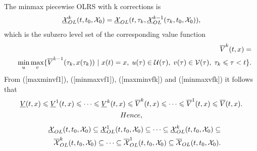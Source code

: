 \documentclass[letterpaper,10pt,english]{sphinxmanual}
\begin{document}
The minmax piecewise OLRS with k corrections is
\begin{gather}
\begin{split}\underline{{\mathcal X}}_{OL}^k(t, t_0, {\mathcal X}_0) =
\underline{{\mathcal X}}_{OL}(t, \tau_k, \underline{{\mathcal X}}_{OL}^{k-1}(\tau_k, t_0, {\mathcal X}_0)),
\label{minmaxk}\end{split}\notag
\end{gather}
which is the subzero level set of the corresponding value function
\begin{gather}
\begin{split}\begin{aligned}
&&\overline{V}^k(t, x) = \nonumber \\
&&\min_u\max_v\{\overline{V}^{k-1}(\tau_k, x(\tau_k)) ~|~ x(t)=x, \;
u(\tau)\in{\mathcal U}(\tau), \; v(\tau)\in{\mathcal V}(\tau), \; \tau_k\leqslant\tau<t\}.
\label{minmaxvfk}\end{aligned}\end{split}\notag
\end{gather}
From ({[}maxminvf1{]}), ({[}minmaxvf1{]}), ({[}maxminvfk{]}) and ({[}minmaxvfk{]}) it
follows that
\begin{gather}
\begin{split}  \underline{V}(t, x) \leqslant\underline{V}^1(t, x)\leqslant\cdots
  \leqslant\underline{V}^k(t, x) \leqslant\overline{V}^k(t, x) \leqslant\cdots
  \leqslant\overline{V}^1(t, x) \leqslant\overline{V}(t, x) .\end{split}\notag\\\begin{split}Hence,\end{split}\notag
\end{gather}\begin{gather}
\begin{split}\begin{aligned}
&&\underline{{\mathcal X}}_{OL}(t, t_0, {\mathcal X}_0) \subseteq \underline{{\mathcal X}}_{OL}^1(t, t_0, {\mathcal X}_0) \subseteq \cdots
\subseteq \underline{{\mathcal X}}_{OL}^k(t, t_0, {\mathcal X}_0) \subseteq \nonumber \\
&&\overline{{\mathcal X}}_{OL}^k(t, t_0, {\mathcal X}_0) \subseteq \cdots \subseteq \overline{{\mathcal X}}_{OL}^1(t, t_0, {\mathcal X}_0)
\subseteq \overline{{\mathcal X}}_{OL}(t, t_0, {\mathcal X}_0) .
\label{olrsinclusion}\end{aligned}\end{split}\notag
\end{gather}
\end{document}
